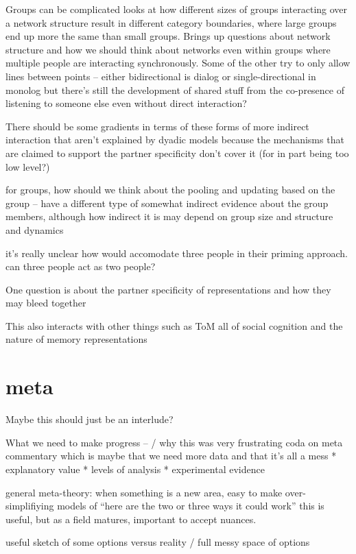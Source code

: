 \documentclass[]{article}
\begin{document}
Groups can be complicated \cite{guilbeault2021} looks at how different sizes of groups interacting over a network structure result in different category boundaries, where large groups end up more the same than small groups. Brings up questions about network structure and how we should think about networks even within groups where multiple people are interacting synchronously. Some of the other try to only allow lines between points -- either bidirectional is dialog or single-directional in monolog but there's still the development of shared stuff from the co-presence of listening to someone else even without direct interaction? 

There should be some gradients in terms of these forms of more indirect interaction that aren't explained by dyadic models because the mechanisms that are claimed to support the partner specificity don't cover it (for in part being too low level?)

\cite{hawkins2021} for groups, how should we think about the pooling and updating based on the group -- have a different type of somewhat indirect evidence about the group members, although how indirect it is may depend on group size and structure and dynamics 

it's really unclear how \cite{pickering2004} would accomodate three people in their priming approach. can three people act as two people? 


One question is about the partner specificity of representations and how they may bleed together

This also interacts with other things such as ToM all of social cognition and the nature of memory representations 



\section{meta}

Maybe this should just be an interlude? 

What we need to make progress -- / why this was very frustrating 
coda on meta commentary which is maybe that we need more data and that it's all a mess 
* explanatory value
* levels of analysis
* experimental evidence

general meta-theory: when something is a new area, easy to make over-simplifiying models of “here are the two or three ways it could work” this is useful, but as a field matures, important to accept nuances.

useful sketch of some options versus reality / full messy space of options
\end{document}
